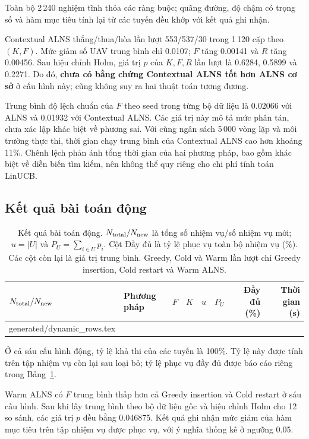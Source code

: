 \documentclass[11pt,a4paper]{article}
\makeatletter
\newcommand{\inputrows}[1]{\@@input #1 }
\makeatother
\begin{document}
Toàn bộ 2\,240 nghiệm tĩnh thỏa các ràng buộc; quãng đường, độ chậm có trọng số và hàm mục tiêu tính lại từ các tuyến đều khớp với kết quả ghi nhận.

Contextual ALNS thắng/thua/hòa lần lượt 553/537/30 trong 1\,120 cặp theo $(K,F)$. Mức giảm số UAV trung bình chỉ 0.0107; $F$ tăng 0.00141 và $R$ tăng 0.00456. Sau hiệu chỉnh Holm, giá trị $p$ của $K,F,R$ lần lượt là 0.6284, 0.5899 và 0.2271. Do đó, \textbf{chưa có bằng chứng Contextual ALNS tốt hơn ALNS cơ sở} ở cấu hình này; cũng không suy ra hai thuật toán tương đương.

Trung bình độ lệch chuẩn của $F$ theo seed trong từng bộ dữ liệu là 0.02066 với ALNS và 0.01932 với Contextual ALNS. Các giá trị này mô tả mức phân tán, chưa xác lập khác biệt về phương sai. Với cùng ngân sách 5\,000 vòng lặp và môi trường thực thi, thời gian chạy trung bình của Contextual ALNS cao hơn khoảng 11\%. Chênh lệch phản ánh tổng thời gian của hai phương pháp, bao gồm khác biệt về diễn biến tìm kiếm, nên không thể quy riêng cho chi phí tính toán LinUCB.

\subsection{Kết quả bài toán động}
\begin{table}[htbp]
\centering\scriptsize
\caption{Kết quả bài toán động. $N_{\rm total}/N_{\rm new}$ là tổng số nhiệm vụ/số nhiệm vụ mới; $u=|U|$ và $P_U=\sum_{i\in U}p_i$. Cột Đầy đủ là tỷ lệ phục vụ toàn bộ nhiệm vụ (\%). Các cột còn lại là giá trị trung bình. Greedy, Cold và Warm lần lượt chỉ Greedy insertion, Cold restart và Warm ALNS.}
\begin{tabular}{@{}llrrrrrr@{}}
\toprule
$N_{\rm total}/N_{\rm new}$ & Phương pháp & $F$ & $K$ & $u$ & $P_U$ & Đầy đủ (\%) & Thời gian (s)\\\midrule
\inputrows{generated/dynamic_rows.tex}
\bottomrule
\end{tabular}
\label{tab:dynamic}
\end{table}

Ở cả sáu cấu hình động, tỷ lệ khả thi của các tuyến là 100\%. Tỷ lệ này được tính trên tập nhiệm vụ còn lại sau loại bỏ; tỷ lệ phục vụ đầy đủ được báo cáo riêng trong Bảng~\ref{tab:dynamic}.

Warm ALNS có $F$ trung bình thấp hơn cả Greedy insertion và Cold restart ở sáu cấu hình. Sau khi lấy trung bình theo bộ dữ liệu gốc và hiệu chỉnh Holm cho 12 so sánh, các giá trị $p$ đều bằng 0.046875. Kết quả ghi nhận mức giảm của hàm mục tiêu trên tập nhiệm vụ được phục vụ, với ý nghĩa thống kê ở ngưỡng 0.05.
\end{document}
